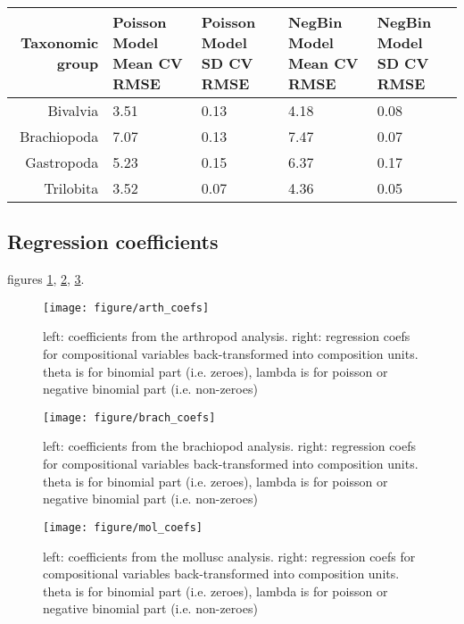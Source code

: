 \documentclass[12pt,letterpaper]{article}
\begin{document}
\begin{sidewaystable}
  \centering
  \caption{}
  \label{tab:cv_rmse}
  \begin{tabular}{rllll}
    \hline
    Taxonomic group & Poisson Model Mean CV RMSE & Poisson Model SD CV RMSE & NegBin Model Mean CV RMSE & NegBin Model SD CV RMSE \\ 
    \hline
    Bivalvia & 3.51 & 0.13 & 4.18 & 0.08 \\ 
    Brachiopoda & 7.07 & 0.13 & 7.47 & 0.07 \\ 
    Gastropoda & 5.23 & 0.15 & 6.37 & 0.17 \\ 
    Trilobita & 3.52 & 0.07 & 4.36 & 0.05 \\ 
    \hline
  \end{tabular}
\end{sidewaystable}

\subsection{Regression coefficients}
figures \ref{fig:arth_coefs}, \ref{fig:brach_coefs}, \ref{fig:mol_coefs}.

\afterpage{\clearpage}
\begin{figure}[h]
  \centering
  \texttt{[image: figure/arth\_coefs]}
  \caption{left: coefficients from the arthropod analysis. right: regression coefs for compositional variables back-transformed into composition units. theta is for binomial part (i.e. zeroes), lambda is for poisson or negative binomial part (i.e. non-zeroes)}
  \label{fig:arth_coefs}
\end{figure}

\afterpage{\clearpage}
\begin{figure}[h]
  \centering
  \texttt{[image: figure/brach\_coefs]}
  \caption{left: coefficients from the brachiopod analysis. right: regression coefs for compositional variables back-transformed into composition units. theta is for binomial part (i.e. zeroes), lambda is for poisson or negative binomial part (i.e. non-zeroes)}
  \label{fig:brach_coefs}
\end{figure}

\afterpage{\clearpage}
\begin{figure}[h]
  \centering
  \texttt{[image: figure/mol\_coefs]}
  \caption{left: coefficients from the mollusc analysis. right: regression coefs for compositional variables back-transformed into composition units. theta is for binomial part (i.e. zeroes), lambda is for poisson or negative binomial part (i.e. non-zeroes)}
  \label{fig:mol_coefs}
\end{figure}
\end{document}
